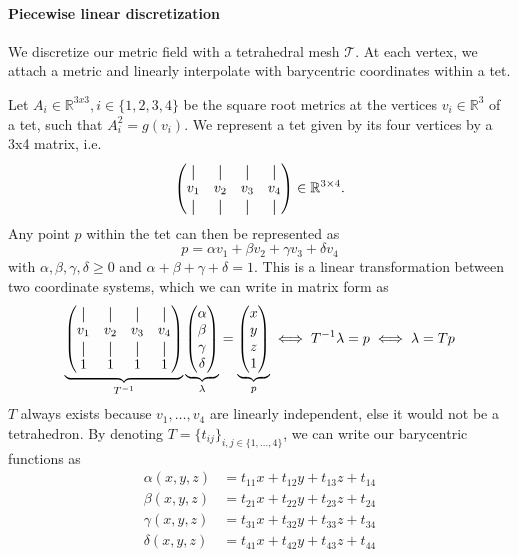 \documentclass[../thesis.tex]{subfiles}
\begin{document}
\paragraph{Piecewise linear discretization}
We discretize our metric field with a tetrahedral mesh $\mathcal{T}$.
At each vertex, we attach a metric and linearly interpolate with barycentric coordinates within a tet.

Let $A_i \in \mathbb{R}^{3x3}, i \in \{1,2,3,4\}$ be the square root metrics at the vertices $v_i \in \mathbb{R}^3$ of a tet, such that
$A^2_i = g(v_i)$. We represent a tet given by its four vertices by a 3x4 matrix, i.e.
$$\begin{pmatrix}
  \vertbar & \vertbar & \vertbar & \vertbar \\
  v_1 & v_2 & v_3 & v_4 \\
  \vertbar & \vertbar & \vertbar & \vertbar
\end{pmatrix} \in \mathbb{R}^{3\times 4}.$$
Any point $p$ within the tet can then be represented as
$$p = \alpha v_1 + \beta v_2 + \gamma v_3 + \delta v_4$$
with $\alpha, \beta, \gamma, \delta \ge 0$ and $\alpha + \beta + \gamma + \delta = 1$.
This is a linear transformation between two coordinate systems, which we can write in matrix form as
$$\underbrace{\begin{pmatrix}
  \vertbar & \vertbar & \vertbar & \vertbar \\
  v_1 & v_2 & v_3 & v_4 \\
  \vertbar & \vertbar & \vertbar & \vertbar \\
  1 & 1 & 1 & 1
\end{pmatrix}}_{T^{-1}}
\underbrace{
\begin{pmatrix}
  \alpha \\ \beta \\ \gamma \\ \delta
\end{pmatrix}}_{\lambda} = \underbrace{\begin{pmatrix}
  x \\ y \\ z \\ 1 
\end{pmatrix}}_{p}
\iff
T^{-1}\lambda = p \iff  \lambda = Tp
$$
$T$ always exists because $v_1, \dots , v_4$ are linearly independent,
else it would not be a tetrahedron.
By denoting $T= \{ t_{ij} \}_{i,j \in \{ 1,\dots, 4\} }$, we can write our barycentric functions as
\begin{align*}
\alpha(x,y,z) &= t_{11}x + t_{12}y + t_{13}z + t_{14} \\
\beta(x,y,z) &= t_{21}x + t_{22}y + t_{23}z + t_{24} \\
\gamma(x,y,z) &= t_{31}x + t_{32}y + t_{33}z + t_{34} \\
\delta(x,y,z) &= t_{41}x + t_{42}y + t_{43}z + t_{44}
\end{align*}
\end{document}
